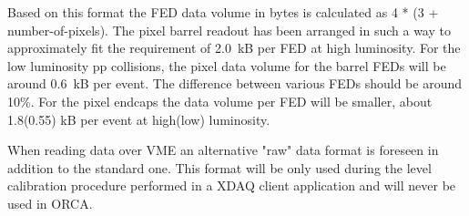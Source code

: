 Based on this format the FED data volume in bytes is calculated as
4 * (3 + number-of-pixels).
The pixel barrel readout has been arranged in such a way to
approximately fit the requirement of 2.0~kB per FED at high luminosity.
For the low luminosity pp collisions, the pixel data volume for
the barrel FEDs will be around 0.6~kB per event.
The difference between various FEDs should be around 10\%.
For the pixel endcaps the data volume per FED will be smaller, 
about 1.8(0.55) kB per event at high(low) luminosity.

When reading data over VME an alternative "raw" data format
is foreseen in addition to the standard one. This format
will be only used during the level calibration procedure
performed in a XDAQ client application and will never be used
in ORCA.

